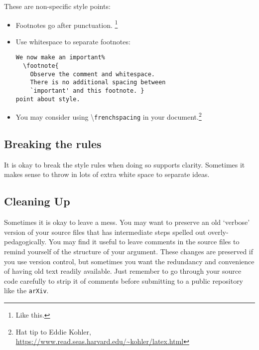 These are non-specific style points:

\begin{itemize}
	\item Footnotes go after punctuation.%
			\footnote{Like this.}
	\item Use whitespace to separate footnotes:
\begin{lstlisting}[style=latexstyle]
We now make an important%
  \footnote{
	Observe the comment and whitespace.
	There is no additional spacing between
	`important' and this footnote. }
point about style.
\end{lstlisting}
	\item You may consider using \textbackslash\texttt{frenchspacing} in your document.\footnote{Hat tip to Eddie Kohler, \url{https://www.read.seas.harvard.edu/~kohler/latex.html}}
\end{itemize}


\subsection{Breaking the rules}

It is okay to break the style rules when doing so supports clarity. Sometimes it makes sense to throw in lots of extra white space to separate ideas.


\subsection{Cleaning Up}

Sometimes it is okay to leave a mess. You may want to preserve an old `verbose' version of your source files that has intermediate steps spelled out overly-pedagogically. You may find it useful to leave comments in the source files to remind yourself of the structure of your argument. These changes are preserved if you use version control, but sometimes you want the redundancy and convenience of having old text readily available. Just remember to go through your source code carefully to strip it of comments before submitting to a public repository like the \texttt{arXiv}.